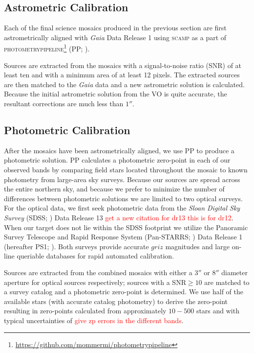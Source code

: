 \documentclass[apj, revtex4]{emulateapj}
\newcommand{\editorial}[1]{\textcolor{red}{#1}}
\begin{document}
\subsection{Astrometric Calibration}
Each of the final science mosaics produced in the previous section are first astrometrically aligned with \textit{Gaia} \citep{GaiaCollaboration2016} Data Release 1 \citep{GaiaCollaboration2016a} using \textsc{scamp} \citep{Bertin2006} as a part of \textsc{photometrypipeline}\footnote{\url{https://github.com/mommermi/photometrypipeline}} (PP; \citealt{Mommert2017}).

Sources are extracted from the mosaics with a signal-to-noise ratio (SNR) of at least ten and with a minimum area of at least 12 pixels. The extracted sources are then matched to the \textit{Gaia} data and a new astrometric solution is calculated. Because the initial astrometric solution from the VO is quite accurate, the resultant corrections are much less than $1''$.

\subsection{Photometric Calibration}
After the mosaics have been astrometrically aligned, we use PP to produce a photometric solution. PP calculates a photometric zero-point in each of our observed bands by comparing field stars located throughout the mosaic to known photometry from large-area sky surveys. Because our sources are spread across the entire northern sky, and because we prefer to minimize the number of differences between photometric solutions we are limited to two optical surveys. For the optical data, we first seek photometric data from the \textit{Sloan Digital Sky Survey} (SDSS; \citealt{York2000}) Data Release 13 \citep{Alam2015} \editorial{get a new citation for dr13 this is for dr12}. When our target does not lie within the SDSS footprint we utilize the Panoramic Survey Telescope and Rapid Response System (Pan-STARRS; \citealt{Chambers2016}) Data Release 1 (hereafter PS1; \citealt{Flewelling2016}). Both surveys provide accurate $griz$ magnitudes and large on-line queriable databases for rapid automated calibration.

Sources are extracted from the combined mosaics with either a $3''$ or $8''$ diameter aperture for optical sources respectively; sources with a SNR$\ge10$ are matched to a survey catalog and a photometric zero-point is determined. We use half of the available stars (with accurate catalog photometry) to derive the zero-point resulting in zero-points calculated from approximately $10-500$ stars and with typical uncertainties of \editorial{give zp errors in the different bands}.
\end{document}
